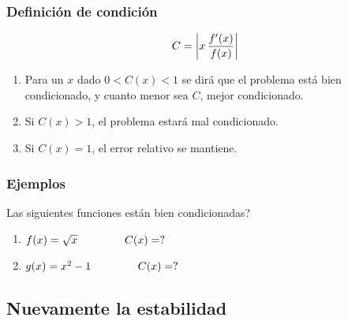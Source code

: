\documentclass[12pt]{beamer}
\begin{document}
\begin{frame}
\frametitle{Definición de condición}
\begin{align*}
C = \abs{ x \, \dfrac{{f}^{\prime} (x)}{f(x)} }
\end{align*}
\begin{enumerate}[<+->]
\item Para un $x$ dado $0 < C (x) < 1$ se dirá que el problema está bien condicionado, y cuanto menor sea $C$, mejor condicionado.
\item Si $C (x) > 1$, el problema estará mal condicionado.
\item Si $C (x) = 1$, el error relativo se mantiene.
\end{enumerate}
\end{frame}
\begin{frame}
\frametitle{Ejemplos}
Las siguientes funciones están bien condicionadas?
\pause
{}
\begin{enumerate}[<+->]
\item $f (x) = \sqrt{x} \hspace{1.5cm} C (x) = ?$
\item $g (x) = x^{2}-1 \hspace{1.5cm} C (x) = ?$
\end{enumerate}
\end{frame}

\subsection{Nuevamente la estabilidad}
\end{document}
